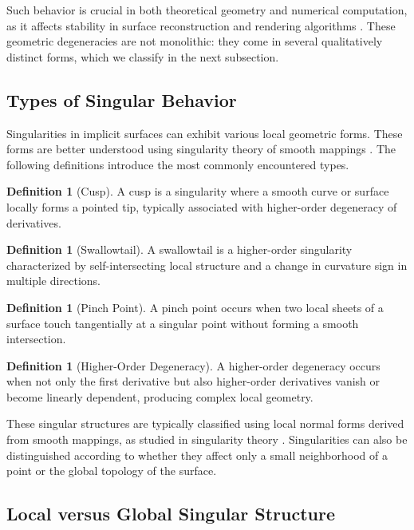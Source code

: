 \documentclass[12pt, a4paper, oneside]{book}
\theoremstyle{plain}
\theoremstyle{definition}
\newtheorem{definition}[theorem]{Definition}
\theoremstyle{remark}
\theoremstyle{definition}
\begin{document}
Such behavior is crucial in both theoretical geometry and numerical computation, as it
affects stability in surface reconstruction and rendering algorithms
\cite{bloomenthal2000implicit}. These geometric degeneracies are not monolithic: they
come in several qualitatively distinct forms, which we classify in the next subsection.

\subsection{Types of Singular Behavior}

Singularities in implicit surfaces can exhibit various local geometric forms. These forms
are better understood using singularity theory of smooth mappings
\cite{arnold2012singularities}. The following definitions introduce the most commonly
encountered types.

\begin{definition}[Cusp]
A cusp is a singularity where a smooth curve or surface locally forms a pointed tip,
typically associated with higher-order degeneracy of derivatives.
\end{definition}

\begin{definition}[Swallowtail]
A swallowtail is a higher-order singularity characterized by self-intersecting local
structure and a change in curvature sign in multiple directions.
\end{definition}

\begin{definition}[Pinch Point]
A pinch point occurs when two local sheets of a surface touch tangentially at a singular
point without forming a smooth intersection.
\end{definition}

\begin{definition}[Higher-Order Degeneracy]
A higher-order degeneracy occurs when not only the first derivative but also higher-order
derivatives vanish or become linearly dependent, producing complex local geometry.
\end{definition}

These singular structures are typically classified using local normal forms derived from
smooth mappings, as studied in singularity theory \cite{arnold2012singularities}.
Singularities can also be distinguished according to whether they affect only a small
neighborhood of a point or the global topology of the surface.

\subsection{Local versus Global Singular Structure}
\end{document}
